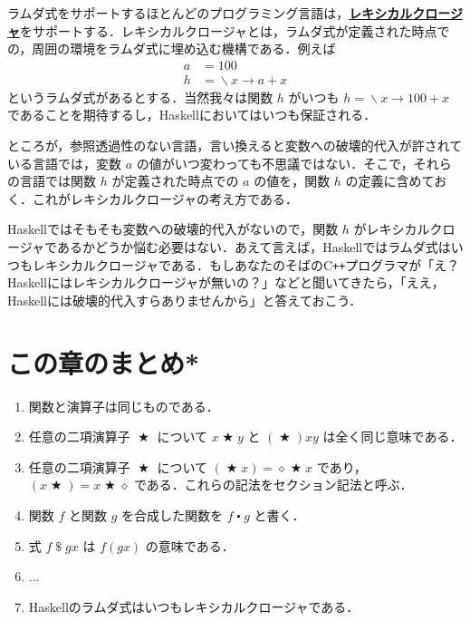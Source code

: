 \documentclass[a4paper,twocolumn]{jsbook}
\newcommand{\programminglanguage}[1]{\textsf{#1}}
\newcommand{\cxx}{\programminglanguage{C}\texttt{++}}
\newcommand{\haskell}{\programminglanguage{Haskell}}
\newcommand{\keyword}[1]{{\underline{\textbf{#1}}}}
\newcommand{\mAnonParam}{\diamond}
\DeclareMathOperator{\mApply}{\$}
\DeclareMathOperator{\mBinOp}{\bigstar}
\DeclareMathOperator{\mComp}{\centerdot}
\DeclareMathOperator{\mLambda}{\backslash}
\DeclareMathOperator{\mLambdaArrow}{\rightarrow}
\newcommand{\mLambdaExp}[2]{\mLambda{#1}\mLambdaArrow{#2}}
\begin{document}
ラムダ式をサポートするほとんどのプログラミング言語は，\keyword{レキシカルクロージャ}をサポートする．レキシカルクロージャとは，ラムダ式が定義された時点での，周囲の環境をラムダ式に埋め込む機構である．例えば
\begin{align}
a&=100\\
h&=\mLambdaExp{x}{a+x}
\end{align}
というラムダ式があるとする．当然我々は関数 $h$ がいつも $h=\mLambdaExp{x}{100+x}$ であることを期待するし，\haskell においてはいつも保証される．

ところが，参照透過性のない言語，言い換えると変数への破壊的代入が許されている言語では，変数 $a$ の値がいつ変わっても不思議ではない．そこで，それらの言語では関数 $h$ が定義された時点での $a$ の値を，関数 $h$ の定義に含めておく．これがレキシカルクロージャの考え方である．

\haskell ではそもそも変数への破壊的代入がないので，関数 $h$ がレキシカルクロージャであるかどうか悩む必要はない．あえて言えば，\haskell ではラムダ式はいつもレキシカルクロージャである．もしあなたのそばの\cxx プログラマが「え？\haskell にはレキシカルクロージャが無いの？」などと聞いてきたら，「ええ，\haskell には破壊的代入すらありませんから」と答えておこう．

\section{この章のまとめ*}

\begin{enumerate}
\item 関数と演算子は同じものである．
\item 任意の二項演算子 $\mBinOp$ について $x\mBinOp y$ と $(\mBinOp)xy$ は全く同じ意味である．
\item 任意の二項演算子 $\mBinOp$ について $(\mBinOp x)=\mAnonParam\mBinOp x$ であり，$(x\mBinOp)=x\mBinOp\mAnonParam$ である．これらの記法をセクション記法と呼ぶ． 
\item 関数 $f$ と関数 $g$ を合成した関数を $f\mComp g$ と書く．
\item 式 $f\mApply gx$ は $f(gx)$ の意味である．
\item ...
\item \haskell のラムダ式はいつもレキシカルクロージャである．
\end{enumerate}
\end{document}
